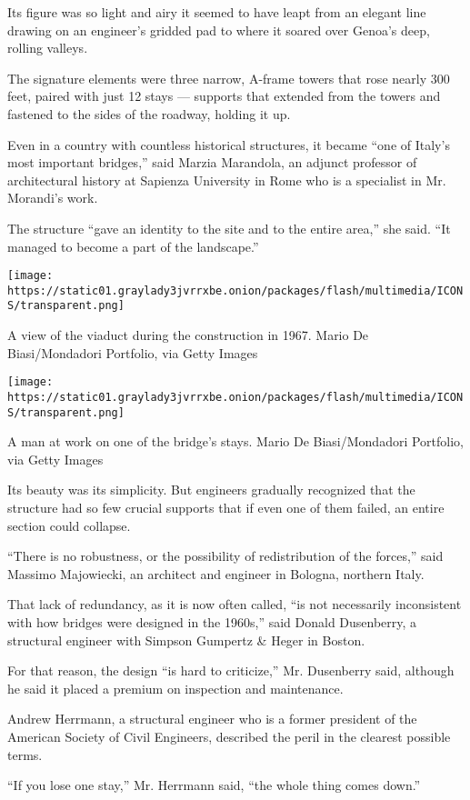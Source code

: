 Its figure was so light and airy it seemed to have leapt from an elegant
line drawing on an engineer's gridded pad to where it soared over
Genoa's deep, rolling valleys.

The signature elements were three narrow, A-frame towers that rose
nearly 300 feet, paired with just 12 stays --- supports that extended
from the towers and fastened to the sides of the roadway, holding it up.

Even in a country with countless historical structures, it became ``one
of Italy's most important bridges,'' said Marzia Marandola, an adjunct
professor of architectural history at Sapienza University in Rome who is
a specialist in Mr. Morandi's work.

The structure ``gave an identity to the site and to the entire area,''
she said. ``It managed to become a part of the landscape.''

\texttt{[image: https://static01.graylady3jvrrxbe.onion/packages/flash/multimedia/ICONS/transparent.png]}

A view of the viaduct during the construction in 1967. Mario De
Biasi/Mondadori Portfolio, via Getty Images

\texttt{[image: https://static01.graylady3jvrrxbe.onion/packages/flash/multimedia/ICONS/transparent.png]}

A man at work on one of the bridge's stays. Mario De Biasi/Mondadori
Portfolio, via Getty Images

Its beauty was its simplicity. But engineers gradually recognized that
the structure had so few crucial supports that if even one of them
failed, an entire section could collapse.

``There is no robustness, or the possibility of redistribution of the
forces,'' said Massimo Majowiecki, an architect and engineer in Bologna,
northern Italy.

That lack of redundancy, as it is now often called, ``is not necessarily
inconsistent with how bridges were designed in the 1960s,'' said Donald
Dusenberry, a structural engineer with Simpson Gumpertz \& Heger in
Boston.

For that reason, the design ``is hard to criticize,'' Mr. Dusenberry
said, although he said it placed a premium on inspection and
maintenance.

Andrew Herrmann, a structural engineer who is a former president of the
American Society of Civil Engineers, described the peril in the clearest
possible terms.

``If you lose one stay,'' Mr. Herrmann said, ``the whole thing comes
down.''

